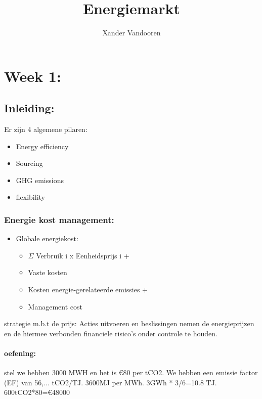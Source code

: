 \documentclass[12pt]{article}
\begin{document}
\begin{titlepage}
    \author{Xander Vandooren}
    \title{Energiemarkt}
\end{titlepage}
\maketitle
\newpage
\tableofcontents
\newpage
{}
\section{Week 1:}
\subsection{Inleiding:}
Er zijn 4 algemene pilaren:\begin{itemize}
    \item Energy efficiency 
    \item Sourcing 
    \item GHG emissions 
    \item flexibility
\end{itemize}
\subsubsection{Energie kost management:}
\begin{itemize}
    \item[] Globale energiekost:\begin{itemize}
        \item $\Sigma$ { Verbruik i x Eenheidsprijs i } +
        \item Vaste kosten 
        \item Kosten energie-gerelateerde emissies + 
        \item Management cost
    \end{itemize}
\end{itemize}
strategie m.b.t de prijs: Acties uitvoeren en beslissingen nemen de energieprijzen en de hiermee verbonden financiele risico's onder controle te houden.
\paragraph{oefening:}
stel we hebben 3000 MWH en het is €80 per tCO2. We hebben een emissie factor (EF) van 56,... tCO2/TJ.
3600MJ per MWh. 3GWh * 3/6=10.8 TJ. 600tCO2*80=€48000
\end{document}
